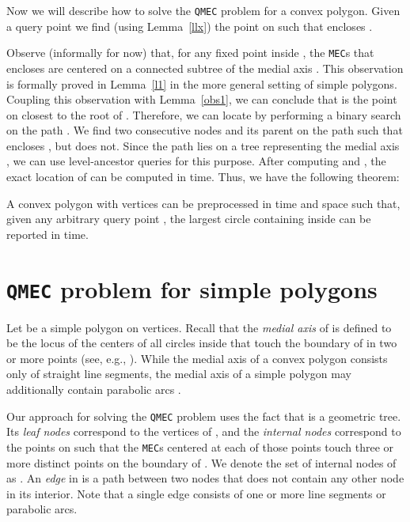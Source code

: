 \documentclass[12pt]{llncs}
\begin{document}
Now we will describe how to solve the {\tt QMEC} problem for a convex
polygon. Given a  query point  we find (using Lemma\ \ref{llx}) the point  on 
 such that  encloses . 

Observe (informally for now) that, for any fixed point  inside , the {\tt MEC}s 
that encloses  are centered on a connected subtree  of the medial axis . This observation is formally proved in Lemma\ \ref{l1} in the more general setting of 
simple polygons. Coupling this observation with Lemma\ \ref{obs1}, we can conclude 
that  is the point on  closest to the root  of . Therefore, we can 
locate  by performing a binary
search on the path . We find two consecutive nodes  
and its parent  on the path  such that  encloses , but 
 does not.  Since the path lies on a 
tree representing the medial axis , we can use level-ancestor 
queries \cite{BF04} for this purpose. After computing  and , 
the exact location of  can be computed in  time. Thus, 
we have the following theorem:

\begin{theorem} \label{th-QMEC-convex}
A convex polygon  with   vertices can be preprocessed in  time
and space such that, given any arbitrary query point , the largest circle 
containing 
 inside  
can be reported in  time.
\end{theorem}



\vspace{-0.2in}
\section{{\tt QMEC} problem for simple polygons} \label{sec:simple-polygon-case}
Let  be a simple polygon on  vertices. Recall that the
{\it medial axis}  of  is defined to be the locus of  the centers of all
circles inside  that touch the boundary of
 in two or more points (see, e.g.,  \cite{CSW99}). While the medial axis of
a convex polygon consists only of straight line segments, the medial axis of 
a simple polygon may additionally contain parabolic arcs \cite{P1977}.

Our approach for solving the 
{\tt QMEC} problem uses the fact that 
 is a geometric tree. Its {\it leaf nodes} 
correspond to the vertices of , and the {\it internal nodes}
correspond to the points on  such that the {\tt MEC}s  centered at each 
of those points touch three or more distinct points on the boundary 
of . We  denote the set of internal nodes of  as . An {\it edge} in 
 is a path between two nodes that does not contain  any other node in its interior. Note that 
 a single edge  consists of one or more line segments or parabolic arcs.
\end{document}
